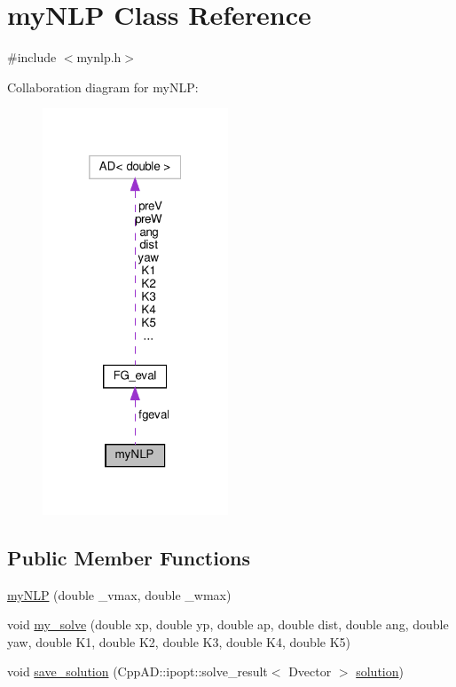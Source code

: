 \hypertarget{classmyNLP}{}\section{my\+N\+LP Class Reference}
\label{classmyNLP}


{\ttfamily \#include $<$mynlp.\+h$>$}



Collaboration diagram for my\+N\+LP\+:
\nopagebreak
\begin{figure}[H]
\begin{center}
\leavevmode
\includegraphics[width=157pt]{classmyNLP__coll__graph}
\end{center}
\end{figure}
\subsection*{Public Member Functions}
\begin{DoxyCompactItemize}
\item 
\hyperlink{classmyNLP_afc4d8a138c3bfbae32449c4360ef4b16}{my\+N\+LP} (double \+\_\+vmax, double \+\_\+wmax)
\item 
void \hyperlink{classmyNLP_ad8eba55aefb5ece257f2c6959aef3f91}{my\+\_\+solve} (double xp, double yp, double ap, double dist, double ang, double yaw, double K1, double K2, double K3, double K4, double K5)
\item 
void \hyperlink{classmyNLP_a71acace73426061aef73e43f31396efa}{save\+\_\+solution} (Cpp\+A\+D\+::ipopt\+::solve\+\_\+result$<$ Dvector $>$ \hyperlink{classmyNLP_ab56c3a82e2b58faa2278143b0d014ff2}{solution})
\end{DoxyCompactItemize}
